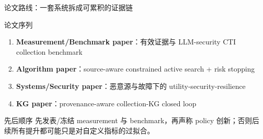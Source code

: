 \begin{frame}{论文路线：一套系统拆成可累积的证据链}
\small
\begin{block}{论文序列}
\begin{enumerate}
  \item \textbf{Measurement/Benchmark paper}：有效证据与 LLM-security CTI collection benchmark
  \item \textbf{Algorithm paper}：source-aware constrained active search + risk stopping
  \item \textbf{Systems/Security paper}：恶意源与故障下的 utility-security-resilience
  \item \textbf{KG paper}：provenance-aware collection-KG closed loop
\end{enumerate}
\end{block}

\begin{alertblock}{先后顺序}
先发表/冻结 measurement 与 benchmark，再声称 policy 创新；否则后续所有提升都可能只是对自定义指标的过拟合。
\end{alertblock}
\end{frame}
